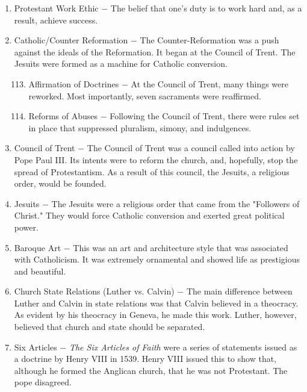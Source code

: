 \documentclass[12pt]{article}
\begin{document}
\begin{enumerate}
\item Protestant Work Ethic $-$ The belief that one's duty is to work hard and, as a result, achieve success.

\item Catholic/Counter Reformation $-$ The Counter-Reformation was a push against the ideals of the Reformation. It began at the Council of Trent. The Jesuits were formed as a machine for Catholic conversion.

\begin{enumerate}[label=\arabic{*}.]
\setcounter{enumii}{112}
\item Affirmation of Doctrines $-$ At the Council of Trent, many things were reworked. Most importantly, seven sacraments were reaffirmed.

\item Reforms of Abuses $-$ Following the Council of Trent, there were rules set in place that suppressed pluralism, simony, and indulgences.

\end{enumerate}
\setcounter{enumi}{114}
\item Council of Trent $-$ The Council of Trent was a council called into action by Pope Paul III. Its intents were to reform the church, and, hopefully, stop the spread of Protestantism. As a result of this council, the Jesuits, a religious order, would be founded.

\item Jesuits $-$ The Jesuits were a religious order that came from the "Followers of Christ." They would force Catholic conversion and exerted great political power.

\item Baroque Art $-$ This was an art and architecture style that was associated with Catholicism. It was extremely ornamental and showed life as prestigious and beautiful.

\item Church State Relations (Luther vs. Calvin) $-$ The main difference between Luther and Calvin in state relations was that Calvin believed in a theocracy. As evident by his theocracy in Geneva, he made this work. Luther, however, believed that church and state should be separated.

\item Six Articles $-$ \textit{The Six Articles of Faith} were a series of statements issued as a doctrine by Henry VIII in 1539. Henry VIII issued this to show that, although he formed the Anglican church, that he was not Protestant. The pope disagreed.


\end{enumerate}
\end{document}

